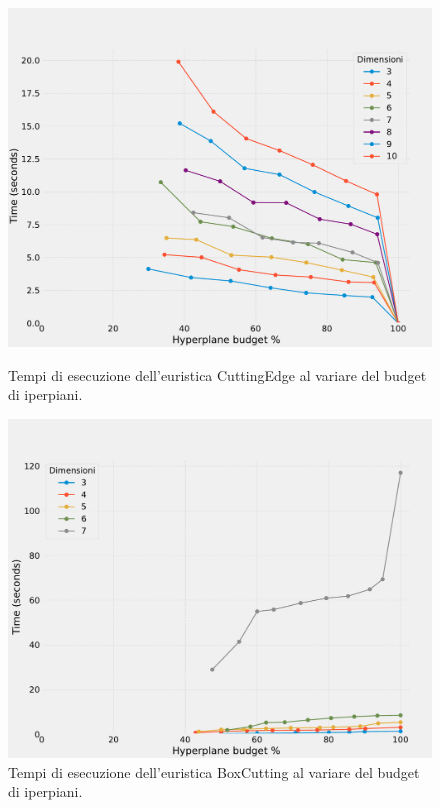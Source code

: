 \begin{figure}[H] 
    \centering
    \begin{minipage}[b]{0.45\textwidth}
        \centering
        \includegraphics[width=\textwidth]{media/report_ndim/ndim_time_diff_CE.pdf}
        \caption{Tempi di esecuzione dell'euristica CuttingEdge al variare del 
        budget di iperpiani.}
        \label{fig: disp_ce}
    \end{minipage}
    \hspace{0.05\textwidth}  %
    \begin{minipage}[b]{0.45\textwidth}
        \centering
        \includegraphics[width=\textwidth]{media/report_ndim/ndim_time_diff_BC.pdf}
        \caption{Tempi di esecuzione dell'euristica BoxCutting al variare 
        del budget di iperpiani.}
        \label{fig: disp_bc}
    \end{minipage}
\end{figure}

